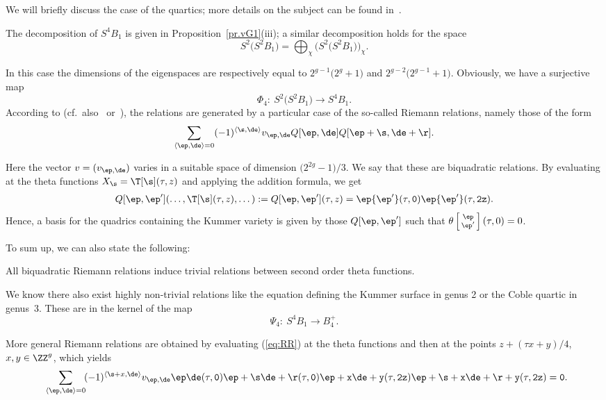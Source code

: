 We will briefly discuss the case of the quartics; more details on the subject can be found in~\cite{vG}.

The decomposition of $S^4B_1$ is given in Proposition~\ref{pr.vG1}(iii); a similar decomposition holds for the space
\[
S^2\big(S^2B_1\big)=\bigoplus_{\chi} \big(S^2\big(S^2B_1\big)\big)_{\chi}.
\]

In this case the dimensions of the eigenspaces are respectively equal to $2^{g-1} \big(2^g+1\big)$ and $2^{g-2}\big(2^{g-1}+1\big)$. Obviously, we have a surjective map
\[
 \Phi_4\colon \ S^2\big(S^2B_1\big)\to S^4B_1.
\]
 According to \cite{fay} (cf.\ also~\cite{APS} or~\cite{FGS}), the relations are generated by a particular case of the so-called Riemann relations, namely those of the form
\begin{gather}\label{eq:RR}
\sum_{\langle\ep,\de\rangle =0} (-1)^{\langle \s, \de\rangle} v_{\ep,\de}Q[\ep, \de]Q[\ep+\s, \de+\r] .
\end{gather}

Here the vector $v=( v_{\ep,\de})$ varies in a suitable space of dimension $\big(2^{2g}-1\big)/3$. We say that these are biquadratic relations. By evaluating at the theta functions
$X_{\s}=\T[\s](\tau,z)$ and applying the addition formula, we get
\begin{gather}\label{eq:vT}
Q[\ep, \ep'](\dots,\T[\s](\tau,z),\dots):=Q[\ep, \ep'](\tau, z) =\tt \ep {\ep'} (\tau, 0)\tt \ep {\ep'} (\tau, 2z).
 \end{gather}
Hence, a basis for the quadrics containing the Kummer variety is given by those $Q[\ep, \ep']$ such that
$\theta\left[\begin{smallmatrix}\ep \\ \ep' \end{smallmatrix}\right] (\tau, 0)=0$.

To sum up, we can also state the following:

\begin{Proposition} \label{trivial relations}
All biquadratic Riemann relations induce trivial relations between second order theta functions.
\end{Proposition}

 We know there also exist highly non-trivial relations like the equation defining the Kummer surface in genus 2 or the Coble quartic in genus~3. These are in the kernel of the map
\[
\Psi_4\colon \ S^4B_1\to B_4^+.
\]
\begin{Remark} More general Riemann relations are obtained by evaluating (\ref{eq:RR}) at the theta functions and then at the points $z+(\tau x+y)/4$, $x,y \in\ZZ^g$, which yields
\begin{gather}\label{eq:RR2}
\sum_{\langle\ep,\de\rangle =0}\! (-1)^{\langle\s+x, \de\rangle } v_{\ep,\de} \tt\ep\de(\tau,0)\tt{\ep+\s }{\de+\r}(\tau,0)\tt{\ep+x}{\de+y}(\tau,2z)\tt{\ep+\s+x}{\de+\r+y}(\tau,2z)=0.\!\!\!
\end{gather}
\end{Remark}
